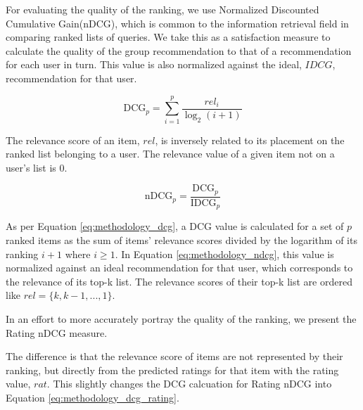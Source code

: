 \label{sec:methodology_ndcg}
For evaluating the quality of the ranking, we use Normalized Discounted Cumulative Gain(nDCG), which is common to the information retrieval field in comparing ranked lists of queries\cite{ndcg}. We take this as a satisfaction measure to calculate the quality of the group recommendation to that of a recommendation for each user in turn. This value is also normalized against the ideal, $IDCG$, recommendation for that user.


\begin{equation}\label{eq:methodology_dcg}
\text{DCG}_p = \sum_{i=1}^{p}\frac{\textit{rel}_i}{\log_2(i + 1)}
\end{equation}

The relevance score of an item, $rel$, is inversely related to its placement on the ranked list belonging to a user. The relevance value of a given item not on a user's list is 0.

\begin{equation}\label{eq:methodology_ndcg}
\text{nDCG}_p = \frac{\text{DCG}_p}{\text{IDCG}_p}
\end{equation}

As per Equation \ref{eq:methodology_dcg}, a DCG value is calculated for a set of $p$ ranked items as the sum of items' relevance scores divided by the logarithm of its ranking $i + 1$ where $i \geq 1$. In Equation \ref{eq:methodology_ndcg}, this value is normalized against an ideal recommendation for that user, which corresponds to the relevance of its top-k list. The relevance scores of their top-k list are ordered like $rel = \{k, k-1,..., 1\}$.

In an effort to more accurately portray the quality of the ranking, we present the Rating nDCG measure.

The difference is that the relevance score of items are not represented by their ranking, but directly from the predicted ratings for that item with the rating value, $rat$. This slightly changes the DCG calcuation for Rating nDCG into Equation \ref{eq:methodology_dcg_rating}.

